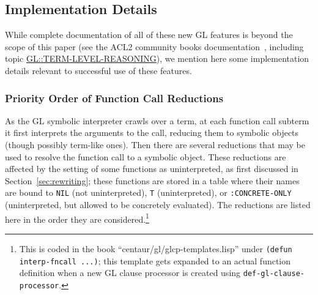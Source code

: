 \documentclass[submission,copyright,creativecommons]{eptcs}
\begin{document}
\subsection{Implementation Details}
\label{sec:details}

While complete documentation of all of these new GL features is beyond
the scope of this paper (see the ACL2 community books
documentation~\cite{acl2:doc}, including topic
\href{http://www.cs.utexas.edu/users/moore/acl2/manuals/current/manual/?topic=GL____TERM-LEVEL-REASONING}{\underline{GL::TERM-LEVEL-REASONING}}),
we mention here some implementation details relevant to successful use
of these features.

\subsubsection{Priority Order of Function Call Reductions}
As the GL symbolic interpreter crawls over a term, at each function
call subterm it first interprets the arguments to the call, reducing
them to symbolic objects (though possibly term-like ones).  Then there
are several reductions that may be used to resolve the function call
to a symbolic object.  These reductions are affected by the setting of
some functions as uninterpreted, as first discussed in
Section~\ref{sec:rewriting}; these functions are stored in a table
where their names are bound to \texttt{NIL} (not uninterpreted),
\texttt{T} (uninterpreted), or \texttt{:CONCRETE-ONLY} (uninterpreted,
but allowed to be concretely evaluated).  The reductions are listed
here in the order they are considered.\footnote{This is coded in the
  book ``centaur/gl/glcp-templates.lisp'' under \texttt{(defun
    interp-fncall ...)}; this template gets expanded to an actual
  function definition when a new GL clause processor is created using
  \texttt{def-gl-clause-processor}.}
\end{document}
